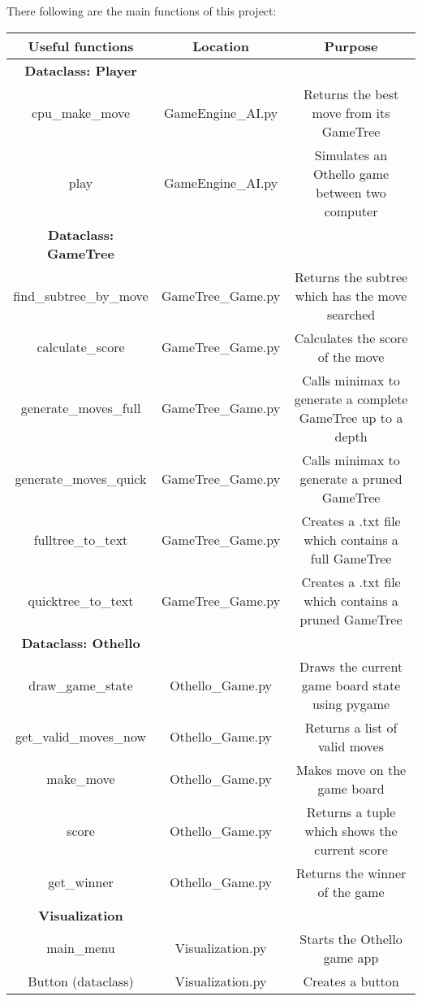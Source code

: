 \documentclass[fontsize=11pt]{article}
\begin{document}
There following are the main functions of this project:\\

\begin{tabular}{||c|c|c||}
    \hline
    Useful functions & Location & Purpose \\
    \hline
    \textbf{Dataclass: Player} & &\\
    \hline
    cpu\_make\_move & GameEngine\_AI.py & Returns the best move from its GameTree\\
    \hline
    play & GameEngine\_AI.py & Simulates an Othello game between two computer \\
    \hline
    \textbf{Dataclass: GameTree} & &\\
    \hline
    find\_subtree\_by\_move & GameTree\_Game.py & Returns the subtree which has the move searched\\
    \hline
    calculate\_score & GameTree\_Game.py & Calculates the score of the move\\
    \hline
    generate\_moves\_full & GameTree\_Game.py & Calls minimax to generate a complete GameTree up to a depth\\
    \hline
    generate\_moves\_quick & GameTree\_Game.py & Calls minimax to generate a pruned GameTree\\
    \hline 
    fulltree\_to\_text & GameTree\_Game.py & Creates a .txt file which contains a full GameTree \\
    \hline
    quicktree\_to\_text & GameTree\_Game.py & Creates a .txt file which contains a pruned GameTree \\
    \hline
    \textbf{Dataclass: Othello} & & \\
    \hline
    draw\_game\_state & Othello\_Game.py & Draws the current game board state using pygame\\
    \hline
    get\_valid\_moves\_now & Othello\_Game.py & Returns a list of valid moves\\
    \hline
    make\_move & Othello\_Game.py & Makes move on the game board\\
    \hline
    score & Othello\_Game.py & Returns a tuple which shows the current score\\
    \hline
    get\_winner & Othello\_Game.py & Returns the winner of the game\\
    \hline
    \textbf{Visualization} & & \\
    \hline
    main\_menu & Visualization.py & Starts the Othello game app\\
    \hline
    Button (dataclass) & Visualization.py & Creates a button\\
    \hline
\end{tabular} \linebreak\\
\end{document}
